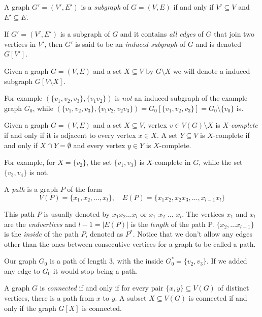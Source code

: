 \begin{defn}[subgraph]
  A graph $G' = (V', E')$ is a \emph{subgraph} of $G = (V, E)$ if and only if $V' \subseteq V$ and $E' \subseteq E$.
\end{defn}

\begin{defn}
  If $G' = (V', E')$ is a subgraph of $G$ and it contains \emph{all edges} of $G$ that join two vertices in $V'$, then $G'$ is said to be an \emph{induced subgraph} of $G$ and is denoted $G[V']$.
\end{defn}

Given a graph $G = (V, E)$ and a set $X \subseteq V$ by $G\setminus X$ we will denote a induced subgraph $G[V\setminus X]$.

For example $(\{v_1, v_2, v_3\}, \{v_1v_2\})$ is \emph{not} an induced subgraph of the example graph $G_0$, while $(\{v_1, v_2, v_3\}, \{v_1v_2, v_2v_3\}) = G_0[\{v_1, v_2, v_3\}] = G_0 \setminus \{v_0\}$ is.

\begin{defn}[$X$-completeness]
  Given a graph $G = (V, E)$ and a set $X \subseteq V$, vertex $v \in V(G) \setminus X$ is \emph{$X$-complete} if and only if it is adjacent to every vertex $x \in X$. A set $Y \subseteq V$ is $X$-complete if and only if $X \cap Y = \emptyset$ and every vertex $y \in Y$ is $X$-complete.
\end{defn}

For example, for $X = \{v_2\}$, the set $\{v_1, v_3\}$ is $X$-complete in $G$, while the set $\{v_3, v_4\}$ is not.

\begin{defn}[path]
  A \emph{path} is a graph $P$ of the form
  \[ V(P) = \{x_1, x_2, \ldots, x_l\},\quad E(P) = \{x_1x_2, x_2x_3, \ldots, x_{l-1}x_l\} \]
\end{defn}
This path $P$ is usually denoted by $x_1x_2\ldots x_l$ or $x_1$-$x_2$-$\ldots$-$x_l$. The vertices $x_1$ and $x_l$ are the \emph{endvertices} and ${l-1} = |E(P)|$ is the \emph{length} of the path P. $\{x_2, \ldots x_{l-1}\}$ is the \emph{inside} of the path $P$, denoted as $P^*$. Notice that we don't allow any edges other than the ones between consecutive vertices for a graph to be called a path.

Our graph $G_0$ is a path of length 3, with the inside $G_0^* = \{v_2, v_3\}$. If we  added any edge to $G_0$ it would stop being a path.


\begin{defn}
  A graph $G$ is \emph{connected} if and only if for every pair $\{x, y\} \subseteq V(G)$ of distinct vertices, there is a path from $x$ to $y$.
  A subset $X \subseteq V(G)$ is connected if and only if the graph $G[X]$ is connected.
\end{defn}

